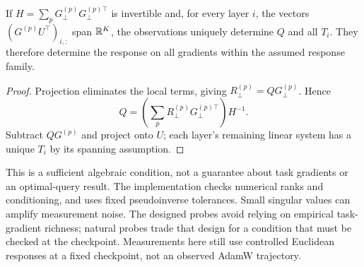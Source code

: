\begin{proposition}
\label{prop:natural-probes}
If $H=\sum_p G_\perp^{(p)}G_\perp^{(p)\top}$ is invertible and, for every
layer $i$, the vectors $(G^{(p)}U^\top)_{i,:}$ span $\mathbb{R}^K$, the observations
uniquely determine $Q$ and all $T_i$. They therefore determine the response
on all gradients within the assumed response family.
\end{proposition}
\begin{proof}
Projection eliminates the local terms, giving
$R_\perp^{(p)}=QG_\perp^{(p)}$. Hence
\[
 Q=\left(\sum_pR_\perp^{(p)}G_\perp^{(p)\top}\right)H^{-1}.
\]
Subtract $QG^{(p)}$ and project onto $U$; each layer's remaining linear
system has a unique $T_i$ by its spanning assumption.
\end{proof}
This is a sufficient algebraic condition, not a guarantee about task gradients
or an optimal-query result. The implementation checks numerical ranks and
conditioning, and uses fixed pseudoinverse tolerances. Small singular values
can amplify measurement noise. The designed probes avoid relying on empirical
task-gradient richness; natural probes trade that design for a condition that
must be checked at the checkpoint. Measurements here still use controlled
Euclidean responses at a fixed checkpoint, not an observed AdamW trajectory.

